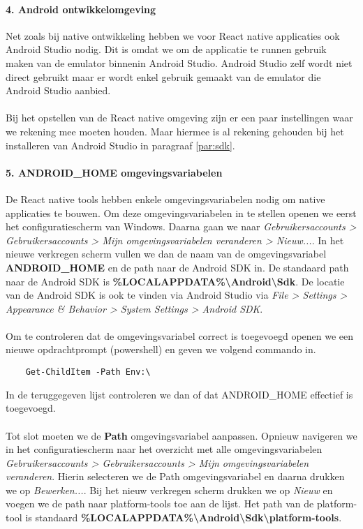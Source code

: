 \paragraph{4. Android ontwikkelomgeving}
Net zoals bij native ontwikkeling hebben we voor React native applicaties ook Android Studio nodig. 
Dit is omdat we om de applicatie te runnen gebruik maken van de emulator binnenin Android Studio. 
Android Studio zelf wordt niet direct gebruikt maar er wordt enkel gebruik gemaakt van de 
emulator die Android Studio aanbied.
\\\\
Bij het opstellen van de React native omgeving zijn er een paar instellingen waar we rekening 
mee moeten houden. Maar hiermee is al rekening gehouden bij het installeren van Android Studio 
in paragraaf \ref{par:sdk}.

\paragraph{5. ANDROID\_HOME omgevingsvariabelen}
De React native tools hebben enkele omgevingsvariabelen nodig om native applicaties te bouwen. 
Om deze omgevingsvariabelen in te stellen openen we eerst het configuratiescherm van Windows. 
Daarna gaan we naar 
\textit{Gebruikersaccounts > Gebruikersaccounts > Mijn omgevingsvariabelen veranderen > Nieuw...}. 
In het nieuwe verkregen scherm vullen we dan de naam van de omgevingsvariabel \textbf{ANDROID\_HOME} 
en de path naar de Android SDK in. De standaard path naar de Android SDK is 
\textbf{\%LOCALAPPDATA\%\backslash Android\backslash Sdk}. 
De locatie van de Android SDK is ook te vinden via Android Studio via 
\textit{File > Settings > Appearance \& Behavior > System Settings > Android SDK}.
\\\\
Om te controleren dat de omgevingsvariabel correct is toegevoegd openen we een nieuwe 
opdrachtprompt (powershell) en geven we volgend commando in.
\begin{verbatim}
    Get-ChildItem -Path Env:\
\end{verbatim}
In de teruggegeven lijst controleren we dan of dat ANDROID\_HOME effectief is toegevoegd.
\\\\
Tot slot moeten we de \textbf{Path} omgevingsvariabel aanpassen. 
Opnieuw navigeren we in het configuratiescherm naar het overzicht met alle omgevingsvariabelen 
\textit{Gebruikersaccounts > Gebruikersaccounts > Mijn omgevingsvariabelen veranderen}. 
Hierin selecteren we de Path omgevingsvariabel en daarna drukken we op \textit{Bewerken...}. 
Bij het nieuw verkregen scherm drukken we op \textit{Nieuw} en voegen we de path naar platform-tools 
toe aan de lijst. Het path van de platform-tool is standaard 
\textbf{\%LOCALAPPDATA\%\backslash Android\backslash Sdk\backslash platform-tools}.


